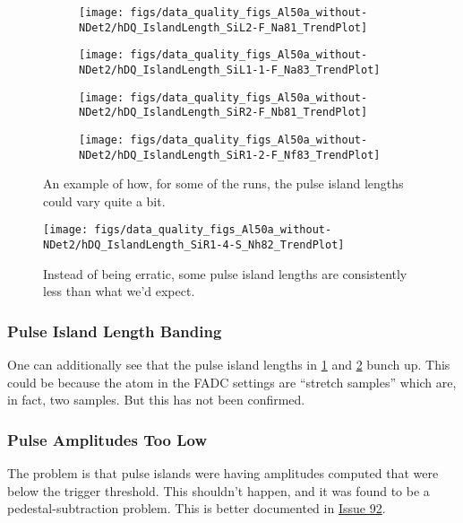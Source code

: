 \documentclass[a4paper]{article}
\newcommand{\issue}[1]{\href{https://github.com/alcap-org/AlcapDAQ/issues/#1}{Issue #1}}
\begin{document}
\begin{figure}
  \centering
  \begin{subfigure}{0.5\textwidth}
    \texttt{[image: figs/data\_quality\_figs\_Al50a\_without-NDet2/hDQ\_IslandLength\_SiL2-F\_Na81\_TrendPlot]}
  \end{subfigure}%
  \begin{subfigure}{0.5\textwidth}
    \texttt{[image: figs/data\_quality\_figs\_Al50a\_without-NDet2/hDQ\_IslandLength\_SiL1-1-F\_Na83\_TrendPlot]}
  \end{subfigure}

  \begin{subfigure}{0.5\textwidth}
    \texttt{[image: figs/data\_quality\_figs\_Al50a\_without-NDet2/hDQ\_IslandLength\_SiR2-F\_Nb81\_TrendPlot]}
  \end{subfigure}%
  \begin{subfigure}{0.5\textwidth}
    \texttt{[image: figs/data\_quality\_figs\_Al50a\_without-NDet2/hDQ\_IslandLength\_SiR1-2-F\_Nf83\_TrendPlot]}
  \end{subfigure}
  \caption{An example of how, for some of the runs, the pulse island lengths could vary quite a bit.}
  \label{fig:al50a_erratic_lengths}
\end{figure}

\begin{figure}
  \centering
  \texttt{[image: figs/data\_quality\_figs\_Al50a\_without-NDet2/hDQ\_IslandLength\_SiR1-4-S\_Nh82\_TrendPlot]}
  \caption{Instead of being erratic, some pulse island lengths are consistently less than what we'd expect.}
  \label{fig:al50a_consistent_bad_lengths}
\end{figure}


\subsubsection{Pulse Island Length Banding}
\label{sec:al50a_tpi_length_bands}
One can additionally see that the pulse island lengths in \ref{fig:al50a_erratic_lengths} and \ref{fig:al50a_consistent_bad_lengths}
bunch up. This could be because the atom in the FADC settings are ``stretch samples'' which are, in fact, two samples.
But this has not been confirmed.


\subsubsection{Pulse Amplitudes Too Low}
\label{sec:al50a_tpi_amp}
The problem is that pulse islands
were having amplitudes computed that were below the trigger threshold. This shouldn't happen, and it was found to be
a pedestal-subtraction problem. This is better documented in \issue{92}.
\end{document}
